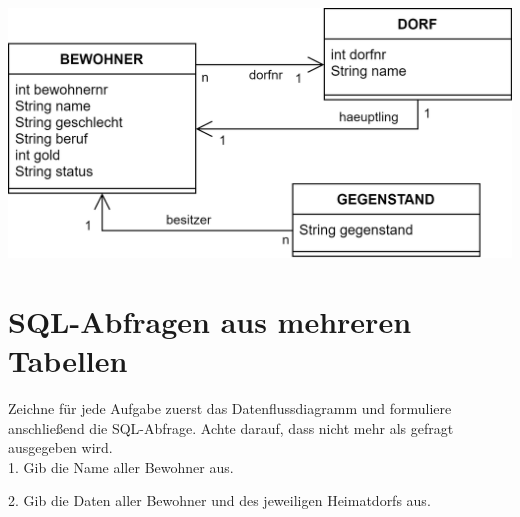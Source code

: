     \begin{center}
        \includegraphics[width=.55\textwidth]{_Aufgaben/SQL-DFD_Uebung_img/DB.png}
    \end{center}
     

    \section{SQL-Abfragen aus mehreren Tabellen}
    Zeichne für jede Aufgabe zuerst das Datenflussdiagramm und formuliere anschließend die SQL-Abfrage. Achte darauf, dass nicht mehr als gefragt ausgegeben wird.\\


    1. Gib die Name aller Bewohner aus.



    2. Gib die Daten aller Bewohner und des jeweiligen Heimatdorfs aus.


